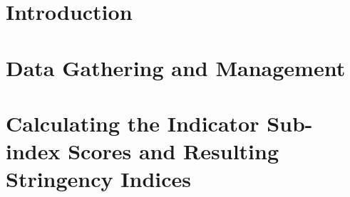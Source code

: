 \documentclass[11pt, a4paper, leqno]{article}
\begin{document}
\tableofcontents
\clearpage



\section*{Introduction} %
\label{sec:introduction}













\section{Data Gathering and Management} %
\label{sec:section1}




\section{Calculating the Indicator Sub-index Scores and Resulting Stringency Indices} %
\label{sec:section2}



\end{document}
